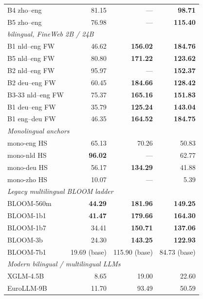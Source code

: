 \begin{table}[!ht]
\begin{tabular}{lrrr}
    B4 zho--eng           & 81.15 & --- & \textbf{98.71} \\
    B5 zho--eng           & 76.98 & --- & \textbf{115.40} \\
    \midrule
    \multicolumn{4}{l}{\textit{\beetle{} bilingual, FineWeb 2B / 24B}} \\
    \midrule
    B1 nld--eng FW        & 46.62 & \textbf{156.02} & \textbf{184.76} \\
    B5 nld--eng FW        & 80.80 & \textbf{171.22} & \textbf{123.62} \\
    B2 nld--eng FW        & 95.97 & --- & \textbf{152.37} \\
    B2 deu--eng FW        & 60.45 & \textbf{184.66} & \textbf{128.42} \\
    B3-33 nld--eng FW     & 75.37 & \textbf{165.16} & \textbf{151.83} \\
    B1 deu--eng FW        & 35.79 & \textbf{125.24} & \textbf{143.04} \\
    B1 eng--deu FW        & 46.35 & \textbf{164.52} & \textbf{184.75} \\
    \midrule
    \multicolumn{4}{l}{\textit{Monolingual \beetle{} anchors}} \\
    \midrule
    mono-eng HS           & 65.13 & 70.26 & 50.83 \\
    mono-nld HS           & \textbf{96.02} & --- & 62.77 \\
    mono-deu HS           & 56.17 & \textbf{134.29} & 41.88 \\
    mono-zho HS           & 10.07 & --- & 5.39 \\
    \midrule
    \multicolumn{4}{l}{\textit{Legacy multilingual BLOOM ladder}} \\
    \midrule
    BLOOM-560m            & \textbf{44.29} & \textbf{181.96} & \textbf{149.25} \\
    BLOOM-1b1             & \textbf{41.47} & \textbf{179.66} & \textbf{164.30} \\
    BLOOM-1b7             & 34.41 & \textbf{150.71} & \textbf{137.06} \\
    BLOOM-3b              & 24.30 & \textbf{143.25} & \textbf{122.93} \\
    BLOOM-7b1             & 19.69 (base) & 115.90 (base) & 84.73 (base) \\
    \midrule
    \multicolumn{4}{l}{\textit{Modern bilingual / multilingual LLMs}} \\
    \midrule
    XGLM-4.5B             & 8.65 & 19.00 & 22.60 \\
    EuroLLM-9B            & 11.70 & 93.49 & 50.59 \\

\end{tabular}
\end{table}
